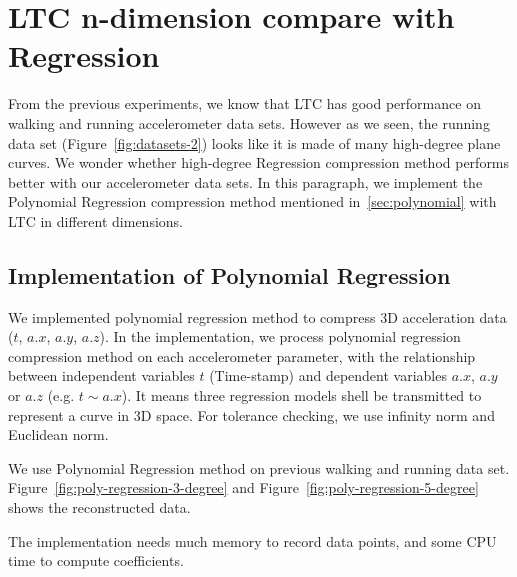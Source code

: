 \section{LTC n-dimension compare with Regression}

From the previous experiments, we know that LTC has good performance on 
walking and running accelerometer data sets. However as we seen, the running data set (Figure~\ref{fig:datasets-2}) looks like it is made of many high-degree plane curves.
We wonder whether high-degree Regression compression method performs better with our accelerometer data sets. In this
paragraph, we implement the Polynomial Regression compression method mentioned in~\ref{sec:polynomial} with LTC in different dimensions. 


\subsection{Implementation of Polynomial Regression}

We implemented polynomial regression method to compress 3D acceleration data
($t$, $a.x$, $a.y$, $a.z$). In the implementation, we process polynomial regression
compression method on each accelerometer parameter, with the relationship between independent variables $t$ (Time-stamp) and dependent
variables $a.x$, $a.y$ or $a.z$ (e.g. $t \sim a.x$). It means 
three regression models shell be transmitted to represent a curve in 3D space.
For tolerance checking, we use infinity norm
and Euclidean norm. 





We use Polynomial Regression method on previous walking and running data set.
Figure~\ref{fig:poly-regression-3-degree} and Figure~\ref{fig:poly-regression-5-degree} shows the reconstructed data. 


The implementation needs much memory to record data points,
and some CPU time to compute coefficients.


